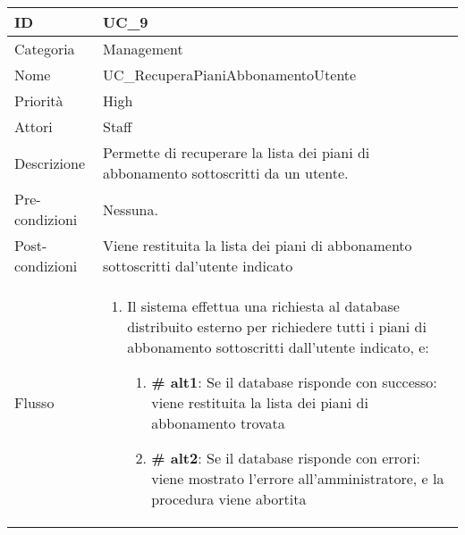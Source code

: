 \begin{center}
\begin{tabular}{ |p{2cm}|p{13cm}|  }
\hline
ID & UC\_9 \\\hline
Categoria & Management\\\hline
Nome & UC\_RecuperaPianiAbbonamentoUtente\\\hline
Priorità & High \\\hline
Attori &  Staff \\\hline
Descrizione & Permette di recuperare la lista dei piani di abbonamento sottoscritti da un utente.\\\hline
Pre-condizioni &  Nessuna.\\\hline
Post-condizioni &  Viene restituita la lista dei piani di abbonamento sottoscritti dal'utente indicato\\\hline
Flusso &  	\begin{enumerate}	
		\item Il sistema effettua una richiesta al database distribuito esterno per richiedere tutti i piani di abbonamento sottoscritti dall'utente indicato, e:
			\begin{enumerate}[  ]
			\item \textbf{\# alt1}: Se il database risponde con successo: viene restituita la lista dei piani di abbonamento trovata
			\item \textbf{\# alt2}: Se il database risponde con errori: viene mostrato l'errore all'amministratore, e la procedura viene abortita
			\end{enumerate}
		\end{enumerate}\\\hline
\end{tabular}
\label{table_use_case:9}\newline



\end{center}

